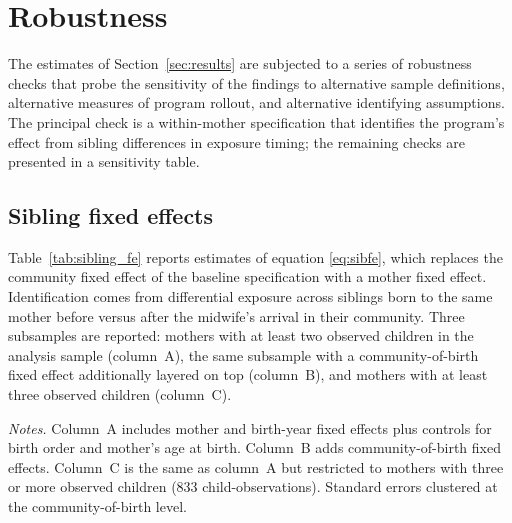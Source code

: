 
\section{Robustness} \label{sec:robustness}

The estimates of Section~\ref{sec:results} are subjected to a series of robustness checks that probe the sensitivity of the findings to alternative sample definitions, alternative measures of program rollout, and alternative identifying assumptions. The principal check is a within-mother specification that identifies the program's effect from sibling differences in exposure timing; the remaining checks are presented in a sensitivity table.

\subsection{Sibling fixed effects}

Table~\ref{tab:sibling_fe} reports estimates of equation \eqref{eq:sibfe}, which replaces the community fixed effect of the baseline specification with a mother fixed effect. Identification comes from differential exposure across siblings born to the same mother before versus after the midwife's arrival in their community. Three subsamples are reported: mothers with at least two observed children in the analysis sample (column~A), the same subsample with a community-of-birth fixed effect additionally layered on top (column~B), and mothers with at least three observed children (column~C).

\begin{table}[!htbp] \centering \caption{Within-mother (sibling-FE) specifications.} \label{tab:sibling_fe}  \begin{minipage}{0.92\textwidth} \footnotesize \emph{Notes.} Column~A includes mother and birth-year fixed effects plus controls for birth order and mother's age at birth. Column~B adds community-of-birth fixed effects. Column~C is the same as column~A but restricted to mothers with three or more observed children (833 child-observations). Standard errors clustered at the community-of-birth level. \end{minipage} \end{table}

